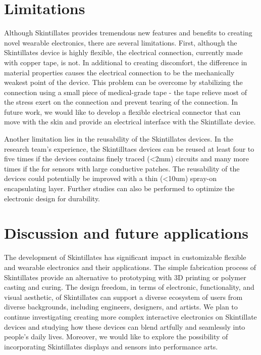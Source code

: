 \documentclass{sigchi}
\begin{document}
\section {Limitations}
Although Skintillates provides tremendous new features and benefits to creating novel wearable electronics, there are several limitations. First, although the Skintillates device is highly flexible, the electrical connection, currently made with copper tape, is not. In additional to creating discomfort, the difference in material  properties causes the electrical connection to be the mechanically weakest point of the device. This problem can be overcome by stabilizing the connection using a small piece of medical-grade tape - the tape relieve most of the stress exert on the connection and prevent tearing of the connection. In future work, we would like to develop a flexible electrical connector that can move with the skin and provide an electrical interface with the Skintillate device. 

Another limitation lies in the reusability of the Skintillates devices. In the research team's experience, the Skintilltaes devices can be reused at least four to five times if the devices contains finely traced (\textless 2mm) circuits and many more times if the for sensors with large conductive patches. The reusability of the devices could potentially be improved with a thin (<10um) spray-on encapsulating layer. Further studies can also be performed to optimize the electronic design for durability. 

\section {Discussion and future applications}
The development of Skintillates has significant impact in customizable flexible and wearable electronics and their applications. The simple fabrication process of Skintillates provide an alternative to prototyping with 3D printing or polymer casting and curing.  The design freedom, in terms of electronic, functionality, and visual aesthetic, of Skintillates can support a diverse ecosystem of users from diverse backgrounds, including engineers, designers, and artists. We plan to continue investigating creating more complex interactive electronics on Skintillate devices and studying how these devices can blend artfully and seamlessly into people's daily lives. Moreover, we would like to explore the possibility of incorporating Skintillates displays and sensors into performance arts. 
\end{document}
